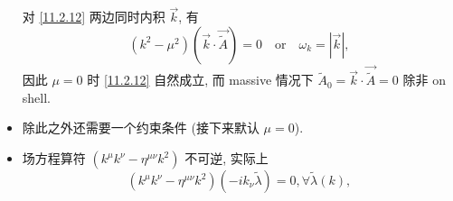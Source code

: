 \begin{itemize}
	\begin{tcolorbox}[title=calculation:]
		对 \eqref{11.2.12} 两边同时内积 $\vec{k}$, 有
		\begin{equation}
			(k^2 - \mu^2) (\vec{k} \cdot \vec{\tilde{A}}) = 0 \quad \text{or} \quad \omega_k = |\vec{k}|,
		\end{equation}
		因此 $\mu = 0$ 时 \eqref{11.2.12} 自然成立, 而 massive 情况下 $\tilde{A}_0 = \vec{k} \cdot \vec{\tilde{A}} = 0$ 除非 on shell.
	\end{tcolorbox}
	
	\item 除此之外还需要一个约束条件 (接下来默认 $\mu = 0$).
	
	\item 场方程算符 $(k^\mu k^\nu - \eta^{\mu \nu} k^2)$ 不可逆, 实际上
	\begin{equation}
		(k^\mu k^\nu - \eta^{\mu \nu} k^2) (- i k_\nu \tilde{\lambda}) = 0, \forall \tilde{\lambda}(k),
	\end{equation}
	
\end{itemize}
